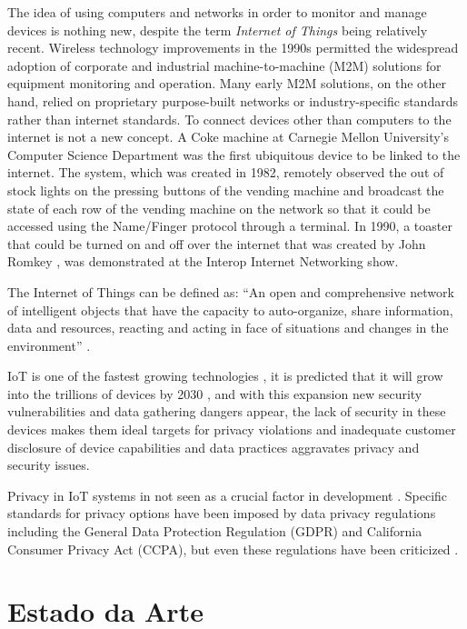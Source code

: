 \documentclass[conference]{IEEEtran}
\begin{document}
The idea of using computers and networks in order to monitor and manage
devices is nothing new, despite the term \textit{Internet of Things} being
relatively recent.
Wireless technology improvements in the 1990s permitted the widespread
adoption of corporate and industrial machine-to-machine (M2M) solutions
for equipment monitoring and operation. Many early M2M solutions, on the
other hand, relied on proprietary purpose-built networks or industry-specific
standards rather than internet standards. To connect devices other than
computers to the internet is not a new concept. A Coke machine at Carnegie
Mellon University's Computer Science Department \cite{EverhartInteresting}
was the first ubiquitous device to be linked to the internet. The system,
which was created in 1982, remotely observed the out of stock lights on
the pressing buttons of the vending machine and broadcast the state of each
row of the vending machine on the network so that it could be accessed using
the Name/Finger protocol through a terminal. In 1990, a toaster that could
be turned on and off over the internet that was created by John Romkey \cite{RomkeyToast},
was demonstrated at the Interop Internet Networking show.

The Internet of Things can be defined as: ``An open and comprehensive network
of intelligent objects that have the capacity to auto-organize, share information,
data and resources, reacting and acting in face of situations and changes
in the environment'' \cite{madakam2015internet}.

IoT is one of the fastest growing technologies \cite{MohammadState}, it
is predicted that it will grow into the trillions of devices by 2030 \cite{SarawiInternet},
and with this expansion new security vulnerabilities and data gathering
dangers appear, the lack of security in these devices makes them ideal targets
for privacy violations and inadequate customer disclosure of device capabilities
and data practices aggravates privacy and security issues.

Privacy in IoT systems in not seen as a crucial factor in development \cite{alhirabi2021security}.
Specific standards for privacy options have been imposed by data privacy
regulations including the General Data Protection Regulation (GDPR) and
California Consumer Privacy Act (CCPA), but even these regulations have
been criticized \cite{peloquin2020disruptive, gladis2022weaponizing, gentile2022deficient, green2022flaws, byun2019privacy}.

\section{Estado da Arte}
\end{document}
